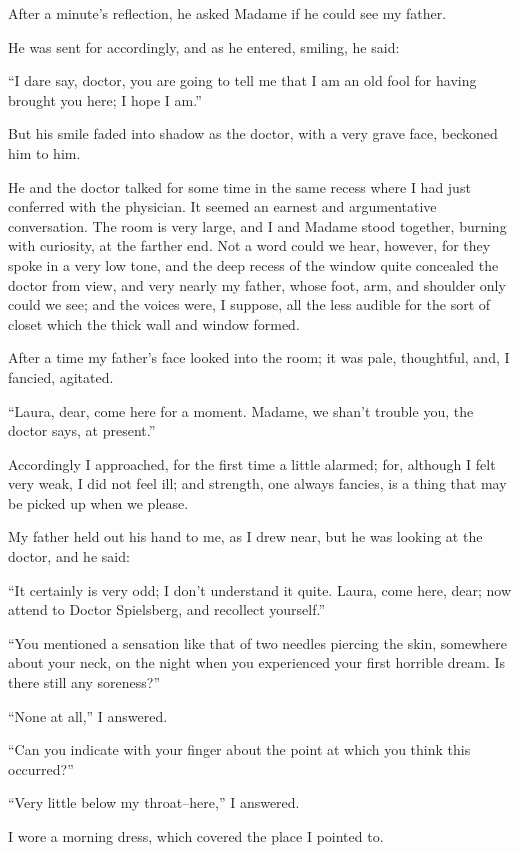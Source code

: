 \documentclass[11pt,twoside,makeidx,hidelinks,]{memoir}
\begin{document}
After a minute's reflection, he asked Madame if he could see my father.

He was sent for accordingly, and as he entered, smiling, he said:

``I dare say, doctor, you are going to tell me that I am an old fool for
having brought you here; I hope I am.''

But his smile faded into shadow as the doctor, with a very grave face,
beckoned him to him.

He and the doctor talked for some time in the same recess where I had
just conferred with the physician. It seemed an earnest and
argumentative conversation. The room is very large, and I and Madame
stood together, burning with curiosity, at the farther end. Not a word
could we hear, however, for they spoke in a very low tone, and the deep
recess of the window quite concealed the doctor from view, and very
nearly my father, whose foot, arm, and shoulder only could we see; and
the voices were, I suppose, all the less audible for the sort of closet
which the thick wall and window formed.

After a time my father's face looked into the room; it was pale,
thoughtful, and, I fancied, agitated.

``Laura, dear, come here for a moment. Madame, we shan't trouble you, the
doctor says, at present.''

Accordingly I approached, for the first time a little alarmed; for,
although I felt very weak, I did not feel ill; and strength, one always
fancies, is a thing that may be picked up when we please.

My father held out his hand to me, as I drew near, but he was looking at
the doctor, and he said:

``It certainly is very odd; I don't understand it quite. Laura, come
here, dear; now attend to Doctor Spielsberg, and recollect yourself.''

``You mentioned a sensation like that of two needles piercing the skin,
somewhere about your neck, on the night when you experienced your first
horrible dream. Is there still any soreness?''

``None at all,'' I answered.

``Can you indicate with your finger about the point at which you think
this occurred?''

``Very little below my throat--here,'' I answered.

I wore a morning dress, which covered the place I pointed to.
\end{document}
